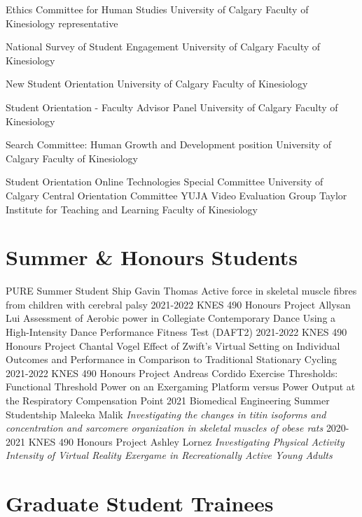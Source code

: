 \documentclass[]{friggeri-cv}
\begin{document}
{Ethics Committee for Human Studies}
{University of Calgary}
{Faculty of Kinesiology representative}

{National Survey of Student Engagement}
{University of Calgary}
{Faculty of Kinesiology}

{New Student Orientation}
{University of Calgary}
{Faculty of Kinesiology}

{Student Orientation - Faculty Advisor Panel}
{University of Calgary}
{Faculty of Kinesiology}

{Search Committee: Human Growth and Development position}
{University of Calgary}
{Faculty of Kinesiology}

    {Student Orientation Online Technologies Special Committee}
    {University of Calgary}
    {Central Orientation Committee}
{YUJA Video Evaluation Group}
{Taylor Institute for Teaching and Learning }
{Faculty of Kinesiology}
\section{Summer \& Honours Students}
{PURE Summer Student Ship \textendash Gavin Thomas}
{}
{Active force in skeletal muscle fibres from children with cerebral palsy}
\entry
{2021-2022}
{KNES 490 Honours Project \textendash Allysan Lui }{}{Assessment of Aerobic power in Collegiate Contemporary Dance Using a High-Intensity Dance Performance Fitness Test (DAFT2)}{}
\entry
{2021-2022}
{KNES 490 Honours Project \textendash Chantal Vogel }{}{Effect of Zwift’s Virtual Setting on Individual Outcomes and Performance in Comparison to Traditional Stationary Cycling}{}
\entry
{2021-2022}
{KNES 490 Honours Project \textendash Andreas Cordido }{}{Exercise Thresholds: Functional Threshold Power on an Exergaming Platform versus Power Output at the Respiratory Compensation Point}{}
\entry
{2021}
{Biomedical Engineering Summer Studentship \textendash Maleeka Malik}
{}
{\textit{Investigating the changes in titin isoforms and concentration and sarcomere organization in skeletal muscles of obese rats}}
{}
\entry
{2020-2021}
{KNES 490 Honours Project \textendash Ashley Lornez}
{}
{\textit{Investigating Physical Activity Intensity of Virtual Reality Exergame in Recreationally Active Young Adults}}{}
\section{Graduate Student Trainees}
\end{document}
